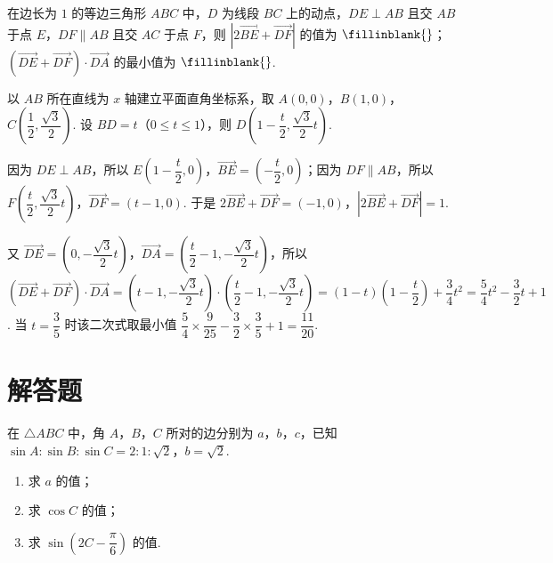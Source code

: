 \begin{problem}
在边长为 \( 1 \) 的等边三角形 \(ABC\) 中，\(D\) 为线段 \(BC\) 上的动点，\( DE\perp AB \) 且交 \(AB\) 于点 \(E\)，\( DF\parallel AB \) 且交 \(AC\) 于点 \(F\)，则 \( \left| 2\overrightarrow{BE}+\overrightarrow{DF} \right| \) 的值为 \(\fillinblank{}\)；\( \left( \overrightarrow{DE}+\overrightarrow{DF} \right)\cdot \overrightarrow{DA} \) 的最小值为 \(\fillinblank{}\).

\end{problem}


\begin{solution}
以 \(AB\) 所在直线为 \(x\) 轴建立平面直角坐标系，取 \(A(0,0)\)，\(B(1,0)\)，\(C\left(\dfrac12,\dfrac{\sqrt3}2\right)\). 设 \(BD=t\)（\(0\le t\le1\)），则 \(D\left(1-\dfrac t2,\dfrac{\sqrt3}2t\right)\).

因为 \(DE\perp AB\)，所以 \(E\left(1-\dfrac t2,0\right)\)，\(\overrightarrow{BE}=\left(-\dfrac t2,0\right)\)；因为 \(DF\parallel AB\)，所以 \(F\left(\dfrac t2,\dfrac{\sqrt3}2t\right)\)，\(\overrightarrow{DF}=\left(t-1,0\right)\). 于是 \(2\overrightarrow{BE}+\overrightarrow{DF}=(-1,0)\)，\(\left|2\overrightarrow{BE}+\overrightarrow{DF}\right|=1\).

又 \(\overrightarrow{DE}=\left(0,-\dfrac{\sqrt3}2t\right)\)，\(\overrightarrow{DA}=\left(\dfrac t2-1,-\dfrac{\sqrt3}2t\right)\)，所以 \(\left(\overrightarrow{DE}+\overrightarrow{DF}\right)\cdot\overrightarrow{DA}=\left(t-1,-\dfrac{\sqrt3}2t\right)\cdot\left(\dfrac t2-1,-\dfrac{\sqrt3}2t\right)=(1-t)\left(1-\dfrac t2\right)+\dfrac34t^2=\dfrac54t^2-\dfrac32t+1\). 当 \(t=\dfrac35\) 时该二次式取最小值 \(\dfrac54\times\dfrac9{25}-\dfrac32\times\dfrac35+1=\dfrac{11}{20}\).
\end{solution}

\section{解答题}

\begin{problem}
在 \( \triangle ABC \) 中，角 \(A\)，\(B\)，\(C\) 所对的边分别为 \( a \)，\( b \)，\( c \)，已知 \( \sin A:\sin B:\sin C=2:1:\sqrt2 \)，\( b=\sqrt2 \).

\begin{enumerate}
\item 求 \( a \) 的值；
\item 求 \( \cos C \) 的值；
\item 求 \( \sin\left( 2C-\dfrac{\pi}{6} \right) \) 的值.
\end{enumerate}
\end{problem}

